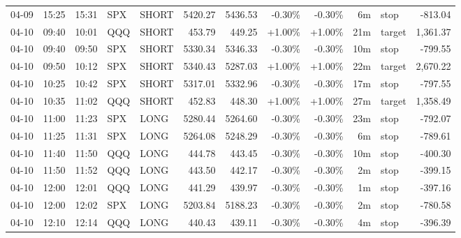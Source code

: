 \documentclass[11pt,a4paper,twoside]{article}
\begin{document}
\begin{center}
\begin{longtable}{>{\color{txtmain}}l l l l l r r r r r >{\color{txtmain}}l r}
04-09 & 15:25 & 15:31 & SPX & SHORT & 5420.27 & 5436.53 & \textcolor{lossred}{-0.30\%} & \textcolor{lossred}{-0.30\%} & 6m & stop & \textcolor{lossred}{-813.04} \\
04-10 & 09:40 & 10:01 & QQQ & SHORT & 453.79 & 449.25 & \textcolor{wingreen}{+1.00\%} & \textcolor{wingreen}{+1.00\%} & 21m & target & \textcolor{wingreen}{1,361.37} \\
04-10 & 09:40 & 09:50 & SPX & SHORT & 5330.34 & 5346.33 & \textcolor{lossred}{-0.30\%} & \textcolor{lossred}{-0.30\%} & 10m & stop & \textcolor{lossred}{-799.55} \\
04-10 & 09:50 & 10:12 & SPX & SHORT & 5340.43 & 5287.03 & \textcolor{wingreen}{+1.00\%} & \textcolor{wingreen}{+1.00\%} & 22m & target & \textcolor{wingreen}{2,670.22} \\
04-10 & 10:25 & 10:42 & SPX & SHORT & 5317.01 & 5332.96 & \textcolor{lossred}{-0.30\%} & \textcolor{lossred}{-0.30\%} & 17m & stop & \textcolor{lossred}{-797.55} \\
04-10 & 10:35 & 11:02 & QQQ & SHORT & 452.83 & 448.30 & \textcolor{wingreen}{+1.00\%} & \textcolor{wingreen}{+1.00\%} & 27m & target & \textcolor{wingreen}{1,358.49} \\
04-10 & 11:00 & 11:23 & SPX & LONG & 5280.44 & 5264.60 & \textcolor{lossred}{-0.30\%} & \textcolor{lossred}{-0.30\%} & 23m & stop & \textcolor{lossred}{-792.07} \\
04-10 & 11:25 & 11:31 & SPX & LONG & 5264.08 & 5248.29 & \textcolor{lossred}{-0.30\%} & \textcolor{lossred}{-0.30\%} & 6m & stop & \textcolor{lossred}{-789.61} \\
04-10 & 11:40 & 11:50 & QQQ & LONG & 444.78 & 443.45 & \textcolor{lossred}{-0.30\%} & \textcolor{lossred}{-0.30\%} & 10m & stop & \textcolor{lossred}{-400.30} \\
04-10 & 11:50 & 11:52 & QQQ & LONG & 443.50 & 442.17 & \textcolor{lossred}{-0.30\%} & \textcolor{lossred}{-0.30\%} & 2m & stop & \textcolor{lossred}{-399.15} \\
04-10 & 12:00 & 12:01 & QQQ & LONG & 441.29 & 439.97 & \textcolor{lossred}{-0.30\%} & \textcolor{lossred}{-0.30\%} & 1m & stop & \textcolor{lossred}{-397.16} \\
04-10 & 12:00 & 12:02 & SPX & LONG & 5203.84 & 5188.23 & \textcolor{lossred}{-0.30\%} & \textcolor{lossred}{-0.30\%} & 2m & stop & \textcolor{lossred}{-780.58} \\
04-10 & 12:10 & 12:14 & QQQ & LONG & 440.43 & 439.11 & \textcolor{lossred}{-0.30\%} & \textcolor{lossred}{-0.30\%} & 4m & stop & \textcolor{lossred}{-396.39} \\

\end{longtable}
\end{center}
\end{document}
